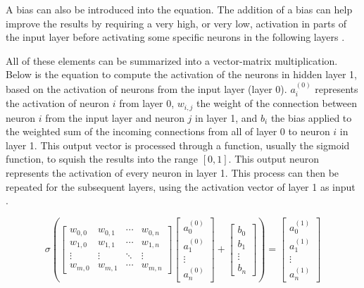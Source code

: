 \documentclass[12pt,a4paper,notitlepage]{article}
\begin{document}
A bias can also be introduced into the equation. The addition of a bias can help improve the results by requiring a very high, or very low, activation in parts of the input layer before activating some specific neurons in the following layers \cite{sanderson_but_2017}.

All of these elements can be summarized into a vector-matrix multiplication. Below is the equation to compute the activation of the neurons in hidden layer 1, based on the activation of neurons from the input layer (layer 0). \(a_i^{(0)}\) represents the activation of neuron \(i\) from layer 0, \(w_{i,j}\) the weight of the connection between neuron \(i\) from the input layer and neuron \(j\) in layer 1, and \(b_i\) the bias applied to the weighted sum of the incoming connections from all of layer 0 to neuron \(i\) in layer 1. This output vector is processed through a function, usually the sigmoid function, to squish the results into the range \([0,1]\). This output neuron represents the activation of every neuron in layer 1. This process can then be repeated for the subsequent layers, using the activation vector of layer 1 as input \cite{sanderson_but_2017}.

\begin{displaymath}
	\sigma
	\left(
	\begin{bmatrix}
		w_{0,0} & w_{0,1} & \cdots & w_{0,n}\\
		w_{1,0} & w_{1,1} & \cdots & w_{1,n}\\
		\vdots & \vdots & \ddots & \vdots\\
		w_{m,0} & w_{m,1} & \cdots & w_{m,n}
	\end{bmatrix}
	\begin{bmatrix}
		a_{0}^{(0)}\\
		a_{1}^{(0)}\\
		\vdots\\
		a_{n}^{(0)}
	\end{bmatrix}
	+
	\begin{bmatrix}
		b_{0}\\
		b_{1}\\
		\vdots\\
		b_{n}
	\end{bmatrix}
	\right)
	=
	\begin{bmatrix}
		a_{0}^{(1)}\\
		a_{1}^{(1)}\\
		\vdots\\
		a_{n}^{(1)}
	\end{bmatrix}
\end{displaymath}
\end{document}
